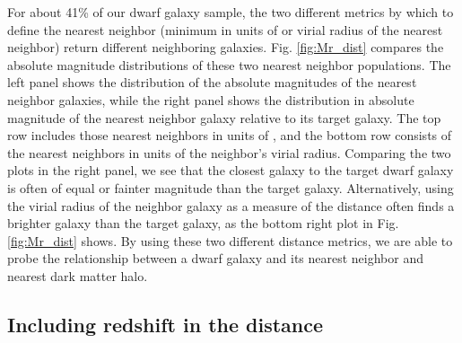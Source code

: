 For about 41\% of our dwarf galaxy sample, the two different metrics by which to 
define the nearest neighbor (minimum in units of \hMpc or virial radius of the 
nearest neighbor) return different neighboring galaxies.  Fig. \ref{fig:Mr_dist} 
compares the absolute magnitude distributions of these two nearest neighbor 
populations.  The left panel shows the distribution of the absolute magnitudes 
of the nearest neighbor galaxies, while the right panel shows the distribution 
in absolute magnitude of the nearest neighbor galaxy relative to its target 
galaxy.  The top row includes those nearest neighbors in units of \hMpc, and the 
bottom row consists of the nearest neighbors in units of the neighbor's virial 
radius.  Comparing the two plots in the right panel, we see that the closest 
galaxy to the target dwarf galaxy is often of equal or fainter magnitude than 
the target galaxy.  Alternatively, using the virial radius of the neighbor 
galaxy as a measure of the distance often finds a brighter galaxy than the 
target galaxy, as the bottom right plot in Fig. \ref{fig:Mr_dist} shows.  By 
using these two different distance metrics, we are able to probe the 
relationship between a dwarf galaxy and its nearest neighbor and nearest dark 
matter halo.


\subsection{Including redshift in the distance}

